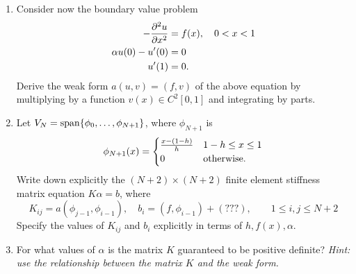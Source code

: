 \begin{enumerate}
\newpage
\item Consider now the boundary value problem 
\begin{align*}
-\frac{\partial^{2} u}{\partial x^{2}} &= f(x), \quad 0 < x < 1\\
\alpha u(0) - u'(0) &= 0\\
u'(1) &= 0.
\end{align*}
Derive the weak form $a(u,v) = (f,v)$ of the above equation by multiplying by a function $v(x) \in C^2[0,1]$ and integrating by parts.  
\item Let $V_N = {\rm span}\{\phi_0,\ldots,\phi_{N+1}\}$, where $\phi_{N+1}$ is 
\[
\phi_{N+1}(x) = \begin{cases}
\frac{x - (1-h)}{h} & 1-h \leq x \leq 1\\
0 & {\rm otherwise}.
\end{cases}
\]
Write down explicitly the $(N+2)\times (N+2)$ finite element stiffness matrix equation $K\alpha = b$, where 
 \[
K_{ij} = a(\phi_{j-1},\phi_{i-1}), \quad b_i = (f,\phi_{i-1}) + (???), \qquad 1 \leq i, j \leq N+2
\]
Specify the values of $K_{ij}$ and $b_i$ explicitly in terms of $h,f(x),\alpha$.  
\item For what values of $\alpha$ is the matrix $K$ guaranteed to be positive definite?  \emph{Hint: use the relationship between the matrix $K$ and the weak form.}
\end{enumerate}


